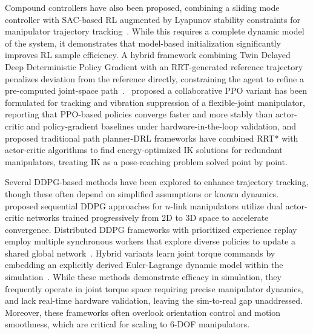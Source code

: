 Compound controllers have also been proposed, combining a sliding mode controller with SAC-based RL
augmented by Lyapunov stability constraints for manipulator trajectory tracking~\citep{liu2022reinforcement, mao2025real}. While this requires
a complete dynamic model of the system, it demonstrates that model-based initialization
significantly improves RL sample efficiency. A hybrid framework combining Twin Delayed Deep
Deterministic Policy Gradient with an RRT-generated reference trajectory penalizes deviation from
the reference directly, constraining the agent to refine a pre-computed joint-space path~\citep{ota2019trajectory}.~\citet{elumalai2025proximal} proposed a collaborative PPO variant has been formulated for tracking and vibration suppression of a flexible-joint manipulator, reporting that PPO-based policies converge faster and more stably than actor-critic and policy-gradient baselines under hardware-in-the-loop validation, and~\citet{li2021general} proposed traditional path planner-DRL frameworks have combined RRT* with actor-critic algorithms to find energy-optimized IK solutions for redundant manipulators, treating IK as a pose-reaching problem solved point by point.

Several DDPG-based methods have been explored to enhance trajectory tracking, though these often
depend on simplified assumptions or known dynamics.~\citet{majumder2024enhancing} proposed sequential DDPG approaches for $n$-link manipulators utilize dual actor-critic networks trained progressively from 2D to 3D space to accelerate convergence. Distributed DDPG frameworks with prioritized experience replay employ multiple synchronous workers that explore diverse policies to update a shared global network~\citep{zhang2019trajectory}. Hybrid variants learn joint torque commands by embedding an explicitly derived Euler-Lagrange dynamic model within the simulation~\citep{hazem2025reinforcement}. While these methods demonstrate efficacy in simulation, they frequently operate in joint torque space requiring precise manipulator dynamics, and lack real-time hardware validation, leaving the sim-to-real gap unaddressed. Moreover, these frameworks often overlook orientation control and motion smoothness, which are critical for scaling to 6-DOF manipulators.

